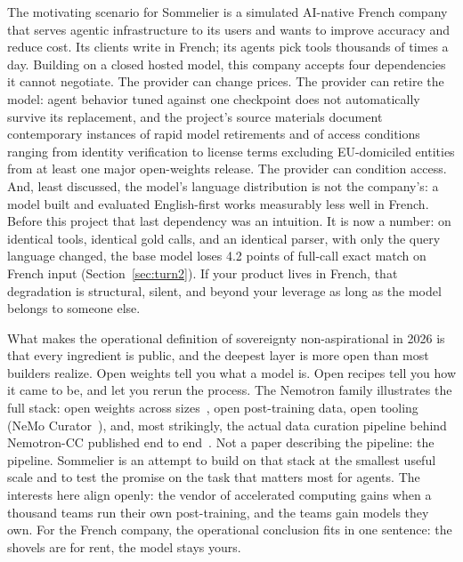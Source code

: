 \documentclass{article}
\newcommand{\sommelier}{Sommelier}
\begin{document}
The motivating scenario for \sommelier{} is a simulated AI-native French company that serves agentic infrastructure to its users and wants to improve accuracy and reduce cost. Its clients write in French; its agents pick tools thousands of times a day. Building on a closed hosted model, this company accepts four dependencies it cannot negotiate. The provider can change prices. The provider can retire the model: agent behavior tuned against one checkpoint does not automatically survive its replacement, and the project's source materials document contemporary instances of rapid model retirements and of access conditions ranging from identity verification to license terms excluding EU-domiciled entities from at least one major open-weights release. The provider can condition access. And, least discussed, the model's language distribution is not the company's: a model built and evaluated English-first works measurably less well in French. Before this project that last dependency was an intuition. It is now a number: on identical tools, identical gold calls, and an identical parser, with only the query language changed, the base model loses 4.2 points of full-call exact match on French input (Section~\ref{sec:turn2}). If your product lives in French, that degradation is structural, silent, and beyond your leverage as long as the model belongs to someone else.

What makes the operational definition of sovereignty non-aspirational in 2026 is that every ingredient is public, and the deepest layer is more open than most builders realize. Open weights tell you what a model is. Open recipes tell you how it came to be, and let you rerun the process. The Nemotron family illustrates the full stack: open weights across sizes~\citep{bercovich2025llamanemotron}, open post-training data, open tooling (NeMo Curator~\citep{nvidia2025nemocurator}), and, most strikingly, the actual data curation pipeline behind Nemotron-CC published end to end~\citep{nvidia2025nemotroncc}. Not a paper describing the pipeline: the pipeline. \sommelier{} is an attempt to build on that stack at the smallest useful scale and to test the promise on the task that matters most for agents. The interests here align openly: the vendor of accelerated computing gains when a thousand teams run their own post-training, and the teams gain models they own. For the French company, the operational conclusion fits in one sentence: the shovels are for rent, the model stays yours.
\end{document}
